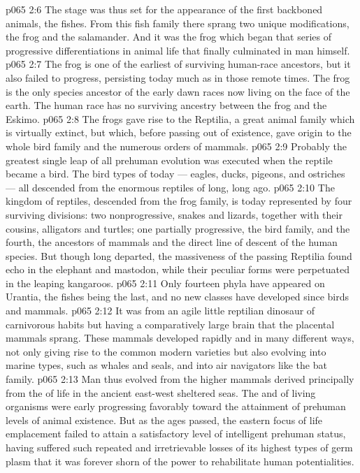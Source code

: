 \vs p065 2:6 \pc The stage was thus set for the appearance of the first backboned animals, the fishes. From this fish family there sprang two unique modifications, the frog and the salamander. And it was the frog which began that series of progressive differentiations in animal life that finally culminated in man himself.
\vs p065 2:7 The frog is one of the earliest of surviving human\hyp{}race ancestors, but it also failed to progress, persisting today much as in those remote times. The frog is the only species ancestor of the early dawn races now living on the face of the earth. The human race has no surviving ancestry between the frog and the Eskimo.
\vs p065 2:8 \pc The frogs gave rise to the Reptilia, a great animal family which is virtually extinct, but which, before passing out of existence, gave origin to the whole bird family and the numerous orders of mammals.
\vs p065 2:9 Probably the greatest single leap of all prehuman evolution was executed when the reptile became a bird. The bird types of today --- eagles, ducks, pigeons, and ostriches --- all descended from the enormous reptiles of long, long ago.
\vs p065 2:10 The kingdom of reptiles, descended from the frog family, is today represented by four surviving divisions: two nonprogressive, snakes and lizards, together with their cousins, alligators and turtles; one partially progressive, the bird family, and the fourth, the ancestors of mammals and the direct line of descent of the human species. But though long departed, the massiveness of the passing Reptilia found echo in the elephant and mastodon, while their peculiar forms were perpetuated in the leaping kangaroos.
\vs p065 2:11 \pc Only fourteen phyla have appeared on Urantia, the fishes being the last, and no new classes have developed since birds and mammals.
\vs p065 2:12 \pc It was from an agile little reptilian dinosaur of carnivorous habits but having a comparatively large brain that the placental mammals  sprang. These mammals developed rapidly and in many different ways, not only giving rise to the common modern varieties but also evolving into marine types, such as whales and seals, and into air navigators like the bat family.
\vs p065 2:13 Man thus evolved from the higher mammals derived principally from the  of life in the ancient east\hyp{}west sheltered seas. The  and  of living organisms were early progressing favorably toward the attainment of prehuman levels of animal existence. But as the ages passed, the eastern focus of life emplacement failed to attain a satisfactory level of intelligent prehuman status, having suffered such repeated and irretrievable losses of its highest types of germ plasm that it was forever shorn of the power to rehabilitate human potentialities.
